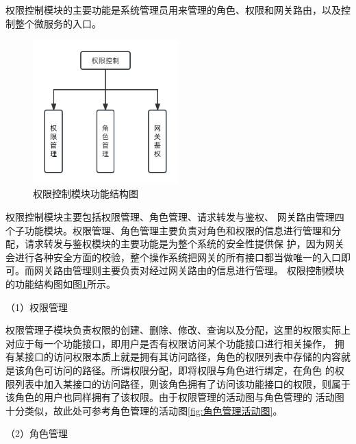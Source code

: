 权限控制模块的主要功能是系统管理员用来管理的角色、权限和网关路由，以及控制整个微服务的入口。
\begin{figure}[h]
    \centering
    \includegraphics[width=0.5\textwidth]{my_figures/chapter4/权限控制模块功能结构图.png}
    \caption{权限控制模块功能结构图}
    \label{fig:权限控制模块功能结构图}
\end{figure}
权限控制模块主要包括权限管理、角色管理、请求转发与鉴权、
网关路由管理四个子功能模块。权限管理、角色管理主要负责对角色和权限的信息进行管理和分配，请求转发与鉴权模块的主要功能是为整个系统的安全性提供保
护，因为网关会进行各种安全方面的校验，整个操作系统把网关的所有接口都当做唯一的入口即可。而网关路由管理则主要负责对经过网关路由的信息进行管理。
权限控制模块的功能结构图如图\ref{fig:权限控制模块功能结构图}所示。




（1）权限管理

权限管理子模块负责权限的创建、删除、修改、查询以及分配，这里的权限实际上对应于每一个功能接口，即用户是否有权限访问某个功能接口进行相关操作，
拥有某接口的访问权限本质上就是拥有其访问路径，角色的权限列表中存储的内容就是该角色可访问的路径。所谓权限分配，即将权限与角色进行绑定，在角色
的权限列表中加入某接口的访问路径，则该角色拥有了访问该功能接口的权限，则属于该角色的用户也同样拥有了该权限。由于权限管理的活动图与角色管理的
活动图十分类似，故此处可参考角色管理的活动图\ref{fig:角色管理活动图}。


（2）角色管理

